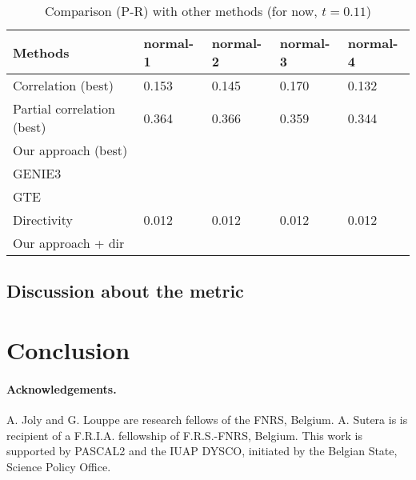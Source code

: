 \documentclass[wcp]{jmlr}
\begin{document}
\begin{table}[htb]
\centering
\caption{Comparison (P-R) with other methods (for now, $t = 0.11$)}
\begin{tabular}{*{5}{l}}
\toprule
Methods             & normal-1 & normal-2 & normal-3 & normal-4 \\
\midrule
Correlation (best)         & 0.153 & 0.145 & 0.170 & 0.132 \\
Partial correlation (best) & 0.364 & 0.366 & 0.359 & 0.344 \\
Our approach (best)        & & & & \\
GENIE3                     & & & & \\
GTE                        & & & & \\
Directivity                & 0.012 & 0.012 & 0.012 & 0.012\\
Our approach + dir         & & & & \\
\bottomrule
\end{tabular}
\end{table}

\subsection{Discussion about the metric}
\label{sec:metric}


\section{Conclusion}





\begin{scriptsize}

\paragraph{Acknowledgements.} A. Joly and G. Louppe are research fellows of
the FNRS, Belgium.  A. Sutera is  is recipient of
a F.R.I.A. fellowship of F.R.S.-FNRS, Belgium.
This work is supported by PASCAL2 and the IUAP DYSCO, initiated by the
Belgian State, Science Policy Office.

\end{scriptsize}

\newpage
\clearpage


\end{document}
